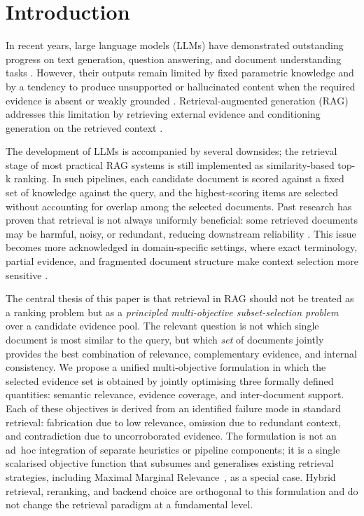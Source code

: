\documentclass[conference]{IEEEtran}
\begin{document}
\section{Introduction}

In recent years, large language models (LLMs) have demonstrated outstanding progress on text generation, question answering, and document understanding tasks \cite{2,3}. However, their outputs remain limited by fixed parametric knowledge and by a tendency to produce unsupported or hallucinated content when the required evidence is absent or weakly grounded \cite{1,9}. Retrieval-augmented generation (RAG) addresses this limitation by retrieving external evidence and conditioning generation on the retrieved context \cite{4,6}.

The development of LLMs is accompanied by several downsides; the retrieval stage of most practical RAG systems is still implemented as similarity-based top-k ranking. In such pipelines, each candidate document is scored against a fixed set of knowledge against the query, and the highest-scoring items are selected without accounting for overlap among the selected documents. Past research has proven that retrieval is not always uniformly beneficial: some retrieved documents may be harmful, noisy, or redundant, reducing downstream reliability \cite{1}. This issue becomes more acknowledged in domain-specific settings, where exact terminology, partial evidence, and fragmented document structure make context selection more sensitive \cite{4,7}.

The central thesis of this paper is that retrieval in RAG should not be treated as a ranking problem but as a \emph{principled multi-objective subset-selection problem} over a candidate evidence pool. The relevant question is not which single document is most similar to the query, but which \emph{set} of documents jointly provides the best combination of relevance, complementary evidence, and internal consistency. We propose a unified multi-objective formulation in which the selected evidence set is obtained by jointly optimising three formally defined quantities: semantic relevance, evidence coverage, and inter-document support. Each of these objectives is derived from an identified failure mode in standard retrieval: fabrication due to low relevance, omission due to redundant context, and contradiction due to uncorroborated evidence. The formulation is not an ad~hoc integration of separate heuristics or pipeline components; it is a single scalarised objective function that subsumes and generalises existing retrieval strategies, including Maximal Marginal Relevance~\cite{10}, as a special case. Hybrid retrieval, reranking, and backend choice are orthogonal to this formulation and do not change the retrieval paradigm at a fundamental level.
\end{document}
